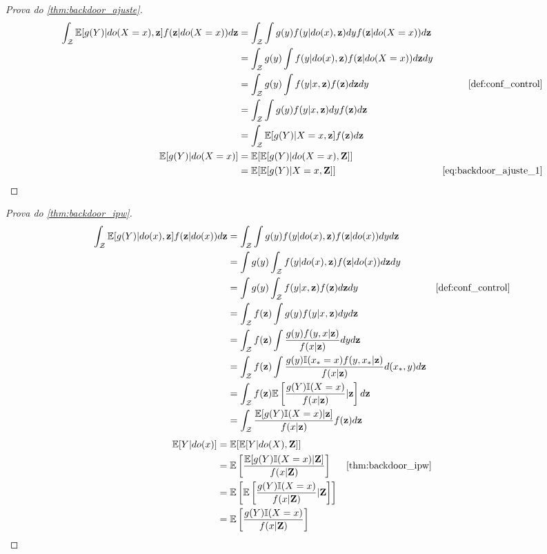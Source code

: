 \begin{proof}[Prova do \cref{thm:backdoor_ajuste}]
 \begin{align}
  \label{eq:backdoor_ajuste_1}
  \int_{\mathcal{Z}} \E[g(Y)|do(X=x),\z] f(\z|do(X=x)) d\z
  &= \int_{\mathcal{Z}} \int g(y) f(y|do(x),\z) dy f(\z|do(X=x)) d\z \nonumber \\
  &= \int_{\mathcal{Z}} g(y) \int f(y|do(x),\z) f(\z|do(X=x)) d\z dy \nonumber \\
  &= \int_{\mathcal{Z}} g(y) \int f(y|x,\z) f(\z) d\z dy
  & \text{\cref{def:conf_control}} \nonumber \\
  &= \int_{\mathcal{Z}} \int g(y)f(y|x,\z) dy f(\z) d\z \nonumber \\
  &= \int_{\mathcal{Z}} \E[g(Y)|X=x,\z] f(\z) d\z \\
  \E[g(Y)|do(X=x)]
  &= \E[\E[g(Y)|do(X=x),\Z]] \nonumber \\
  &= \E[\E[g(Y)|X=x,\Z]]
  & \text{\cref{eq:backdoor_ajuste_1}} \nonumber
 \end{align}
\end{proof}

\begin{proof}[Prova do \cref{thm:backdoor_ipw}]
 \begin{align*}
  \int_{\mathcal{Z}} \E[g(Y)|do(x),\z] f(\z|do(x)) d\z 
  &= \int_{\mathcal{Z}} \int g(y) f(y|do(x),\z) f(\z|do(x)) dy d\z \\
  &= \int g(y) \int_{\mathcal{Z}} f(y|do(x),\z) f(\z|do(x)) d\z dy \\
  &= \int g(y) \int_{\mathcal{Z}} f(y|x,\z) f(\z) d\z dy 
  & \text{\cref{def:conf_control}} \\
  &= \int_{\mathcal{Z}} f(\z) \int g(y) f(y|x,\z)  dy d\z \\
  &= \int_{\mathcal{Z}} f(\z) \int \frac{g(y) f(y,x|\z)}{f(x|\z)} dy d\z \\
  &= \int_{\mathcal{Z}} f(\z) \int \frac{g(y) \I(x_* = x) f(y,x_*|\z)}{f(x|\z)} d(x_*, y) d\z \\
  &= \int_{\mathcal{Z}} f(\z) \E\left[\frac{g(Y)\I(X=x)}{f(x|\z)}|\z\right] d\z \\
  &= \int_{\mathcal{Z}} \frac{\E[g(Y)\I(X=x)|\z]}{f(x|\z)} f(\z) d\z
 \end{align*}
 \begin{align*}
  \E[Y|do(x)]
  &= \E[\E[Y|do(X),\Z]] \\
  &= \E\left[\frac{\E[g(Y)\I(X=x)|\Z]}{f(x|\Z)}\right] 
  & \text{\cref{thm:backdoor_ipw}} \\
  &= \E\left[\E\left[\frac{g(Y)\I(X=x)}{f(x|\Z)}|\Z\right]\right] \\
  &= \E\left[\frac{g(Y)\I(X=x)}{f(x|\Z)}\right]
 \end{align*}
\end{proof}

